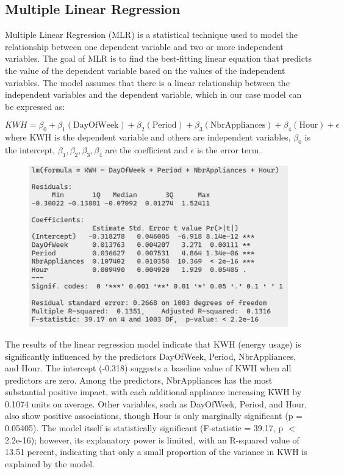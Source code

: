 \documentclass[english,12pt, titlepage]{article}
\begin{document}
	\subsection{Multiple Linear Regression }
	
	Multiple Linear Regression (MLR) is a statistical technique used to model the relationship between one dependent variable and two or more independent variables. The goal of MLR is to find the best-fitting linear equation that predicts the value of the dependent variable based on the values of the independent variables. The model assumes that there is a linear relationship between the independent variables and the dependent variable, which in our case model can be expressed as:
	
	\begin{equation*}
		KWH = \beta_{0} + \beta_{1}(\text{DayOfWeek})  + \beta_{2}(\text{Period})  + \beta_{3}(\text{NbrAppliances}) +\beta_{4}( \text{Hour}) + \epsilon
	\end{equation*}
	where KWH is the dependent variable and others are independent variables, $\beta_{0}$ is the intercept, $\beta_{1}, \beta_{2}, \beta_{3}, \beta_{4}$ are the coefficient and $\epsilon$ is the error term. 
	
	
	\begin{figure}[!ht]
		\centering
		\includegraphics[width=0.55\linewidth]{fig10.jpeg}
		\label{fig11}
	\end{figure}
	
	The results of the linear regression model indicate that KWH (energy usage) is significantly influenced by the predictors DayOfWeek, Period, NbrAppliances, and Hour. The intercept (-0.318) suggests a baseline value of KWH when all predictors are zero. Among the predictors, NbrAppliances has the most substantial positive impact, with each additional appliance increasing KWH by 0.1074 units on average. Other variables, such as DayOfWeek, Period, and Hour, also show positive associations, though Hour is only marginally significant (p = 0.05405). The model itself is statistically significant (F-statistic = 39.17, p $<$ 2.2e-16); however, its explanatory power is limited, with an R-squared value of 13.51 percent, indicating that only a small proportion of the variance in KWH is explained by the model.
	
\end{document}
